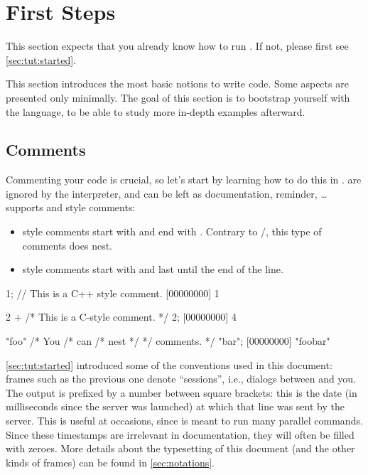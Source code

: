 
\chapter{First Steps}
\label{sec:tut:first}

This section expects that you already know how to run .  If
not, please first see \autoref{sec:tut:started}.

This section introduces the most basic notions to write \us code. Some
aspects are presented only minimally.  The goal of this section is to
bootstrap yourself with the \us language, to be able to study more in-depth
examples afterward.

\section{Comments}

Commenting your code is crucial, so let's start by learning how to do this
in \us.  are ignored by the interpreter, and can be left as
documentation, reminder, \ldots \us supports \langC and \Cxx style comments:

\begin{itemize}
\item \langC style comments start with \textcmt{/*} and end with \textcmt{*/}.
  Contrary to \langC/\Cxx, this type of comments does nest.
\item \Cxx style comments start with \textcmt{//} and last until the end of
  the line.
\end{itemize}

\begin{urbiscript}[firstnumber=1]
1; // This is a C++ style comment.
[00000000] 1

2 + /* This is a C-style comment. */ 2;
[00000000] 4

"foo" /* You /* can /* nest */ */ comments. */ "bar";
[00000000] "foobar"
\end{urbiscript}

\autoref{sec:tut:started} introduced some of the conventions used in this
document: frames such as the previous one denote ``\us sessions'', i.e.,
dialogs between \urbi and you.  The output is prefixed by a number between
square brackets: this is the date (in milliseconds since the server was
launched) at which that line was sent by the server. This is useful at
occasions, since \urbi is meant to run many parallel commands.  Since these
timestamps are irrelevant in documentation, they will often be filled with
zeroes.  More details about the typesetting of this document (and the other
kinds of frames) can be found in \autoref{sec:notations}.

